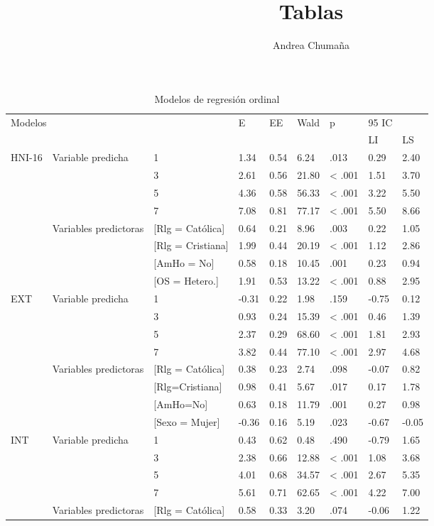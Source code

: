 \documentclass[a4paper,12pt]{article}
\title{Tablas}
\author{Andrea Chumaña}
\begin{document}
\begin{table}
\label{tabla1}
\caption{Modelos de regresión ordinal}
\begin{tabular}{lllllllll}
\hline 
\multicolumn{3}{l}{\multirow{2}{*}{Modelos}} & \multirow{2}{*}{E} &\multirow{2}{*}{EE} & \multirow{2}{*}{Wald}& \multirow{2}{*}{p} & 95 IC\\ \cline{8-9}
& & & & & & & LI & LS \\ \hline
\multirow{8}{*}{HNI-16}&\multirow{4}{*}{Variable predicha}&1& 1.34& 0.54& 6.24& .013& 0.29& 2.40\\
&& 3& 2.61& 0.56& 21.80& < .001& 1.51& 3.70\\
&& 5& 4.36& 0.58 &56.33& < .001& 3.22 &5.50\\
&& 7& 7.08& 0.81& 77.17& < .001& 5.50& 8.66\\
& \multirow{4}{*}{Variables predictoras}&[Rlg = Católica]& 0.64& 0.21& 8.96& .003& 0.22& 1.05\\
&&[Rlg = Cristiana]& 1.99& 0.44& 20.19& < .001& 1.12& 2.86\\
&&[AmHo = No]& 0.58& 0.18& 10.45& .001& 0.23& 0.94\\
&&[OS = Hetero.]& 1.91& 0.53& 13.22& < .001& 0.88& 2.95\\
\multirow{8}{*}{EXT}&\multirow{4}{*}{Variable predicha}& 1& -0.31& 0.22& 1.98& .159& -0.75& 0.12\\
&&3& 0.93& 0.24& 15.39& < .001& 0.46& 1.39\\
&&5& 2.37& 0.29& 68.60& < .001& 1.81& 2.93\\
&&7& 3.82& 0.44& 77.10& < .001& 2.97& 4.68\\
& \multirow{4}{*}{Variables predictoras}& [Rlg = Católica]& 0.38& 0.23& 2.74& .098& -0.07& 0.82\\
&&[Rlg=Cristiana]& 0.98& 0.41& 5.67& .017& 0.17& 1.78\\
&&[AmHo=No]& 0.63& 0.18& 11.79& .001& 0.27& 0.98\\
&&[Sexo = Mujer]& -0.36& 0.16& 5.19& .023& -0.67& -0.05\\
\multirow{7}{*}{INT}&\multirow{4}{*}{Variable predicha}& 1& 0.43& 0.62& 0.48& .490& -0.79& 1.65\\
&&3& 2.38& 0.66& 12.88& < .001& 1.08& 3.68\\
&&5& 4.01& 0.68& 34.57& < .001& 2.67& 5.35\\
&&7& 5.61& 0.71& 62.65& < .001& 4.22& 7.00\\
& \multirow{3}{*}{Variables predictoras}& [Rlg = Católica]& 0.58& 0.33& 3.20& .074& -0.06& 1.22\\

\end{tabular}
\end{table}
\end{document}
